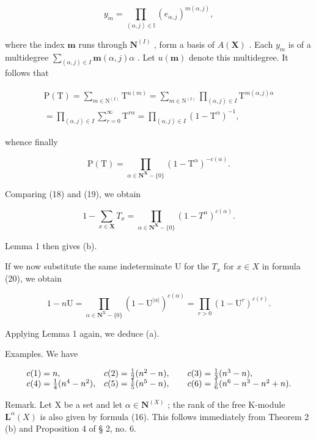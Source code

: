 \[
y _ {m} = \prod_ {(\alpha , j) \in \mathbb {I}} (e _ {\alpha , j}) ^ {m (\alpha , j)},
\]

where the index \(\pmb{m}\) runs through \(\mathbf{N}^{(I)}\) , form a basis of \(A(\mathbf{X})\) . Each \(y_{m}\) is of a multidegree \(\sum_{(\alpha, j) \in I} \pmb{m}(\alpha, j)\alpha\) . Let \(u(\pmb{m})\) denote this multidegree. It follows that

\[
\begin{array}{l} \mathrm{P(T)} = \sum_ {m \in \mathrm{N} ^ {(I)}} \mathrm{T} ^ {u (m)} = \sum_ {m \in \mathrm{N} ^ {(I)}} \prod_ {(\alpha , j) \in I} \mathrm{T} ^ {m (\alpha , j) \alpha} \\ = \prod_ {(\alpha , j) \in I} \sum_ {r = 0} ^ {\infty} \mathrm{T} ^ {r \alpha} = \prod_ {(\alpha , j) \in I} (1 - \mathrm{T} ^ {\alpha}) ^ {- 1}, \end{array}
\]

whence finally

\[
\mathrm{P} (\mathrm{T}) = \prod_ {\alpha \in \mathbf {N} ^ {\mathbf {X}} - \{0 \}} (1 - \mathrm{T} ^ {\alpha}) ^ {- c (\alpha)}.\tag{19}
\]

Comparing (18) and (19), we obtain

\[
1 - \sum_ {x \in \mathbf {X}} T _ {x} = \prod_ {\alpha \in \mathbf {N} ^ {\mathbf {X}} - \{0\}} (1 - T ^ {\alpha}) ^ {c (\alpha)}.\tag{20}
\]

Lemma 1 then gives (b).

If we now substitute the same indeterminate U for the \(T_{x}\) for \(x \in X\) in formula (20), we obtain

\[
1 - n \mathrm{U} = \prod_ {\alpha \in \mathbf {N} ^ {\mathrm{X}} - \{0\}} (1 - \mathrm{U} ^ {| \alpha |}) ^ {c (\alpha)} = \prod_ {r > 0} (1 - \mathrm{U} ^ {r}) ^ {c (r)}.
\]

Applying Lemma 1 again, we deduce (a).

Examples. We have

\[
\begin{array}{l l} c (1) = n, & c (2) = \frac {1}{2} (n ^ {2} - n), \qquad c (3) = \frac {1}{3} (n ^ {3} - n), \\ c (4) = \frac {1}{4} (n ^ {4} - n ^ {2}), & c (5) = \frac {1}{5} (n ^ {5} - n), \qquad c (6) = \frac {1}{6} (n ^ {6} - n ^ {3} - n ^ {2} + n). \end{array}
\]

Remark. Let X be a set and let \(\alpha \in \mathbf{N}^{(X)}\) ; the rank of the free K-module \(\mathbf{L}^{\alpha}(X)\) is also given by formula (16). This follows immediately from Theorem 2 (b) and Proposition 4 of § 2, no. 6.


